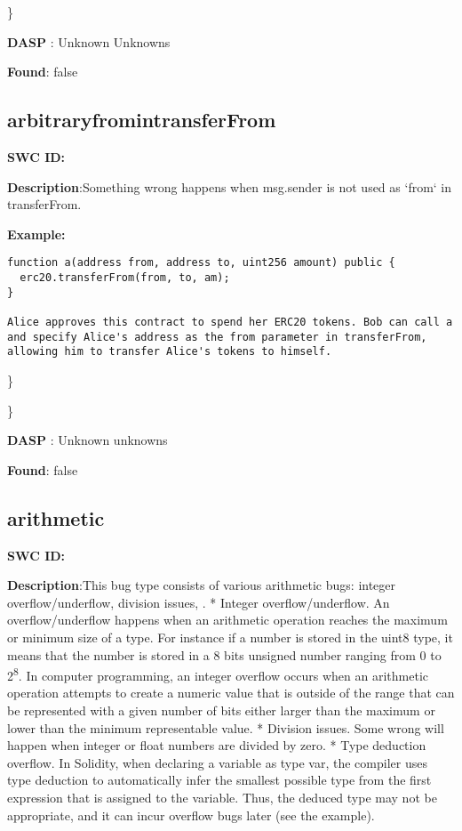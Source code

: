 \documentclass{article}
\begin{document}
\} 

\textbf{DASP} : Unknown Unknowns

\textbf{Found}: false

\subsection{arbitrary\textunderscore from\textunderscore in\textunderscore transferFrom} 
\textbf{SWC \textunderscore ID:} 

\textbf{Description}:Something wrong happens when msg.sender is not used as `from` in transferFrom.


\textbf{Example:} 
\begin{verbatim}
function a(address from, address to, uint256 amount) public {
  erc20.transferFrom(from, to, am);
}

Alice approves this contract to spend her ERC20 tokens. Bob can call a and specify Alice's address as the from parameter in transferFrom, allowing him to transfer Alice's tokens to himself.

\end{verbatim}\} 

\} 

\textbf{DASP} : Unknown unknowns

\textbf{Found}: false

\subsection{arithmetic} 
\textbf{SWC \textunderscore ID:} 

\textbf{Description}:This bug type consists of various arithmetic bugs: integer overflow/underflow, division issues, .
* Integer overflow/underflow. An overflow/underflow happens when an arithmetic operation reaches the maximum or minimum size of a type. For instance if a number is stored in the uint8 type, it means that the number is stored in a 8 bits unsigned number ranging from 0 to 2\textsuperscript8. In computer programming, an integer overflow occurs when an arithmetic operation attempts to create a numeric value that is outside of the range that can be represented with a given number of bits either larger than the maximum or lower than the minimum representable value.
* Division issues. Some wrong will happen when integer or float numbers are divided by zero.
* Type deduction overflow. In Solidity, when declaring a variable as type var, the compiler uses type deduction to automatically infer the smallest possible type from the first expression that is assigned to the variable. Thus, the deduced type may not be appropriate, and it can incur overflow bugs later (see the example).
\end{document}
